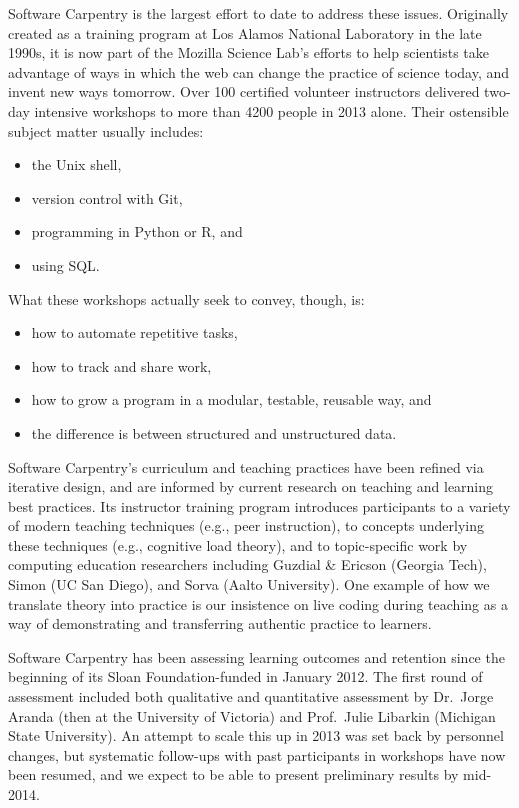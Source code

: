 \documentclass[11pt]{article}
\begin{document}
Software Carpentry is the largest effort to date to address these
issues. Originally created as a training program at Los Alamos
National Laboratory in the late 1990s, it is now part of the Mozilla
Science Lab's efforts to help scientists take advantage of ways in
which the web can change the practice of science today, and invent new
ways tomorrow.  Over 100 certified volunteer instructors delivered
two-day intensive workshops to more than 4200 people in 2013 alone.
Their ostensible subject matter usually includes:

\begin{itemize}
\item
  the Unix shell,
\item
  version control with Git,
\item
  programming in Python or R, and
\item
  using SQL.
\end{itemize}

What these workshops actually seek to convey, though, is:

\begin{itemize}
\item
  how to automate repetitive tasks,
\item
  how to track and share work,
\item
  how to grow a program in a modular, testable, reusable way, and
\item
  the difference is between structured and unstructured data.
\end{itemize}

Software Carpentry's curriculum and teaching practices have been
refined via iterative design, and are informed by current research on
teaching and learning best practices.  Its instructor training program
introduces participants to a variety of modern teaching techniques
(e.g., peer instruction), to concepts underlying these techniques
(e.g., cognitive load theory), and to topic-specific work by computing
education researchers including Guzdial \& Ericson (Georgia Tech),
Simon (UC San Diego), and Sorva (Aalto University).  One example of
how we translate theory into practice is our insistence on live coding
during teaching as a way of demonstrating and transferring authentic
practice to learners.

Software Carpentry has been assessing learning outcomes and retention
since the beginning of its Sloan Foundation-funded in January 2012.
The first round of assessment included both qualitative and
quantitative assessment by Dr.\ Jorge Aranda (then at the University
of Victoria) and Prof.\ Julie Libarkin (Michigan State University).
An attempt to scale this up in 2013 was set back by personnel changes,
but systematic follow-ups with past participants in workshops have now
been resumed, and we expect to be able to present preliminary results
by mid-2014.
\end{document}
